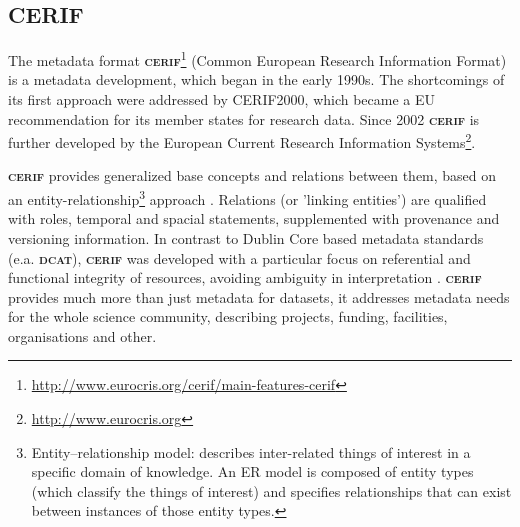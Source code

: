 \documentclass[a4paper,english,twoside,BCOR1.5cm,headsepline,DIV12,appendixprefix,final,12pt]{scrbook}
\newcommand{\dcat}{{\scshape\bfseries dcat}\xspace}
\newcommand{\cerif}{{\scshape\bfseries cerif}\xspace}
\newcommand\footnoteurl[1]{\footnote{\scriptsize\url{#1}}}
\begin{document}
\subsection{CERIF}
\label{sec:cerif}
The metadata format \cerif\footnoteurl{http://www.eurocris.org/cerif/main-features-cerif} (Common European Research Information Format) is a metadata development, which began in the early 1990s. The shortcomings of its first approach were addressed by CERIF2000, which became a EU recommendation for its member states for research data. Since 2002 \cerif is further developed by the European Current Research Information Systems\footnoteurl{http://www.eurocris.org}.

\cerif provides generalized base concepts and relations between them, based on an entity-relationship\footnote{Entity–relationship model: describes inter-related things of interest in a specific domain of knowledge. An ER model is composed of entity types (which classify the things of interest) and specifies relationships that can exist between instances of those entity types.} approach \cite{CerifJefferyA10}. Relations (or 'linking entities') are qualified with roles, temporal and spacial statements, supplemented with provenance and versioning information.
In contrast to Dublin Core based metadata standards (e.a. \dcat), \cerif was developed with a particular focus on referential and functional integrity of resources, avoiding ambiguity in interpretation \cite{jefferyCerifW3C2016}. 
\cerif provides much more than just metadata for datasets, it addresses metadata needs for the whole science community, describing projects, funding, facilities, organisations and other.
\end{document}

